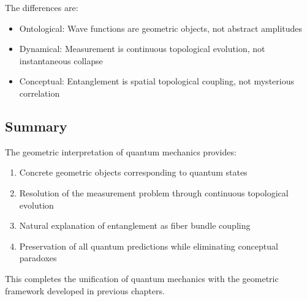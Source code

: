 The differences are:
\begin{itemize}
    \item Ontological: Wave functions are geometric objects, not abstract amplitudes
    \item Dynamical: Measurement is continuous topological evolution, not instantaneous collapse
    \item Conceptual: Entanglement is spatial topological coupling, not mysterious correlation
\end{itemize}

\subsection{Summary}

The geometric interpretation of quantum mechanics provides:
\begin{enumerate}
    \item Concrete geometric objects corresponding to quantum states
    \item Resolution of the measurement problem through continuous topological evolution
    \item Natural explanation of entanglement as fiber bundle coupling
    \item Preservation of all quantum predictions while eliminating conceptual paradoxes
\end{enumerate}

This completes the unification of quantum mechanics with the geometric framework developed in previous chapters.
